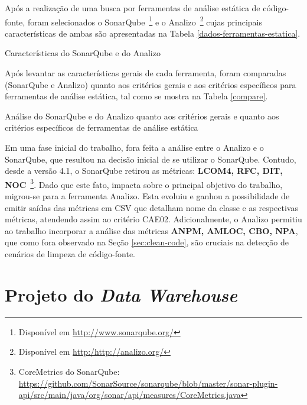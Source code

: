 Após a realização de uma busca por ferramentas de análise estática de código-fonte, foram selecionados o SonarQube~\footnote{Disponível em \url{http://www.sonarqube.org/}} e o Analizo~\footnote{Disponível em \url{http:/http://analizo.org/}} cujas principais características de ambas são apresentadas na Tabela \ref{dados-ferramentas-estatica}.

\begin{savenotes}
\begin{table}[!ht]
\centering

\caption{Características do SonarQube e do Analizo}
\label{dados-ferramentas-estatica}
\end{table}
\FloatBarrier
\end{savenotes}

Após levantar as características gerais de cada ferramenta, foram comparadas (SonarQube e Analizo) quanto aos critérios gerais e aos critérios específicos para ferramentas de análise estática, tal como se mostra na Tabela \ref{compare}.


\begin{table}[!ht]
\centering

\caption{Análise do SonarQube e do Analizo quanto aos critérios gerais e quanto aos critérios específicos de ferramentas de análise estática}
\label{compare}
\end{table}
\FloatBarrier

Em uma fase inicial do trabalho, fora feita a análise entre o Analizo e o SonarQube, que resultou na decisão inicial de se utilizar o SonarQube. Contudo, desde a versão 4.1, o SonarQube retirou as métricas: \textbf{LCOM4, RFC, DIT, NOC}~\footnote{CoreMetrics do SonarQube: \url{https://github.com/SonarSource/sonarqube/blob/master/sonar-plugin-api/src/main/java/org/sonar/api/measures/CoreMetrics.java}}. Dado que este fato, impacta sobre o principal objetivo do trabalho, migrou-se para a ferramenta Analizo. Esta evoluiu e ganhou a possibilidade de emitir saídas das métricas em CSV que detalham nome da classe e as respectivas métricas, atendendo assim ao critério CAE02. Adicionalmente, o Analizo permitiu ao trabalho incorporar a análise das métricas \textbf{ANPM, AMLOC, CBO, NPA}, que como fora observado na Seção \ref{sec:clean-code}, são cruciais na detecção de cenários de limpeza de código-fonte.

\section{Projeto do \textit{Data Warehouse}}
\label{sec:project-dw}

